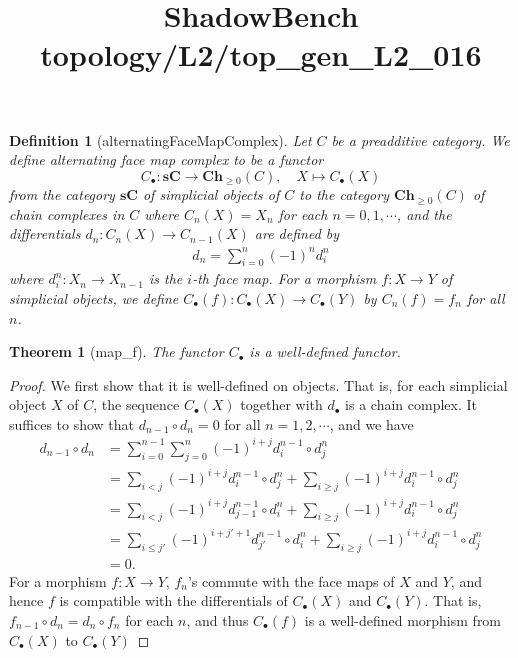 \documentclass{article}
\title{ShadowBench topology/L2/top\_gen\_L2\_016}
\newtheorem{theorem}{Theorem}
\newtheorem{definition}{Definition}
\begin{document}
\maketitle

\begin{definition}[alternatingFaceMapComplex]
    Let $C$ be a preadditive category. We define alternating face map complex to be a functor
    \[
        C_\bullet: \mathbf{sC} \to \mathbf{Ch}_{\ge 0}(C), \quad X \mapsto C_\bullet(X)
    \]
    from the category $\mathbf{sC}$ of simplicial objects of $C$ to the category $\mathbf{Ch}_{\ge 0}(C)$ of chain complexes in $C$ where $C_n(X) = X_n$ for each $n=0,1,\cdots$, and the differentials $d_n:C_n(X) \to C_{n-1}(X)$ are defined by
    \begin{align*}
        d_n = \sum_{i=0}^n (-1)^n d_i^n
    \end{align*}
    where $d_i^n:X_n \to X_{n-1}$ is the $i$-th face map. For a morphism $f:X \to Y$ of simplicial objects, we define $C_\bullet(f):C_\bullet(X) \to C_\bullet(Y)$ by $C_n(f) = f_n$ for all $n$.
\end{definition}

\begin{theorem}[map_f]
    The functor $C_\bullet$ is a well-defined functor.
\end{theorem}
\begin{proof}
    We first show that it is well-defined on objects. That is, for each simplicial object $X$ of $C$, the sequence $C_\bullet(X)$ together with $d_\bullet$ is a chain complex. It suffices to show that $d_{n-1}\circ d_n = 0$ for all $n=1,2,\cdots$, and we have
    \begin{align*}
        d_{n-1} \circ d_n &= \sum_{i=0}^{n-1} \sum_{j=0}^n (-1)^{i+j} d_i^{n-1} \circ d_j^n \\
        &= \sum_{i < j} (-1)^{i+j} d_i^{n-1} \circ d_j^n + \sum_{i \ge j} (-1)^{i+j} d_i^{n-1} \circ d_j^n \\
        &= \sum_{i < j} (-1)^{i+j} d_{j-1}^{n-1} \circ d_i^n + \sum_{i \ge j} (-1)^{i+j} d_i^{n-1} \circ d_j^n \\
        &= \sum_{i \le j'} (-1)^{i+j'+1} d_{j'}^{n-1} \circ d_i^n + \sum_{i \ge j} (-1)^{i+j} d_i^{n-1} \circ d_j^n \\
        &= 0.
    \end{align*}
    For a morphism $f: X \to Y$, $f_n$'s commute with the face maps of $X$ and $Y$, and hence $f$ is compatible with the differentials of $C_\bullet(X)$ and $C_\bullet(Y)$. That is, $f_{n-1} \circ d_n = d_n \circ f_n$ for each $n$, and thus $C_\bullet(f)$ is a well-defined morphism from $C_\bullet(X)$ to $C_\bullet(Y)$
\end{proof}
\end{document}
